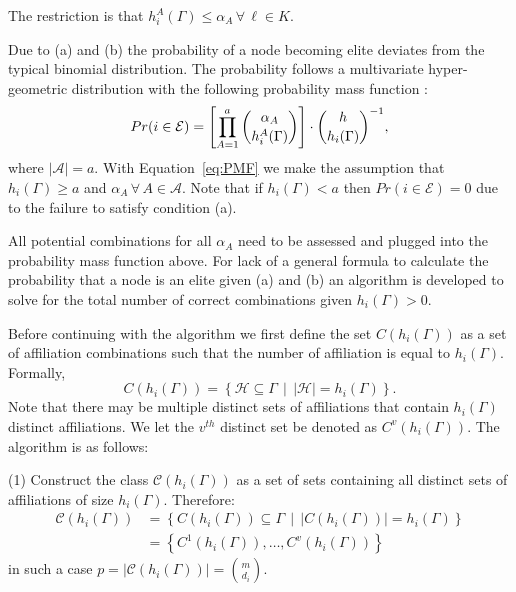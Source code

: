 \begin{subappendices}
\begin{abet}
\item The restriction is that $h^{A}_{i}(\Gamma) \leqslant \alpha_{A} \, \forall \, \ell \in K$.
\end{abet}
Due to (a) and (b) the probability of a node becoming elite deviates from the typical binomial distribution. The probability follows a multivariate hyper-geometric distribution with the following probability mass function :
\begin{equation} \label{eq:PMF}
Pr(i \in \mathcal{E}) =  \left[ \prod_{A = 1}^{a} \dbinom{\alpha_{A}}{h^{A}_{i}(\Gamma)} \right] \cdot \dbinom{h}{h_{i}(\Gamma)}^{-1},
\end{equation}
where $| \mathcal{A} | = a$. With Equation~\ref{eq:PMF} we make the assumption that $h_{i}(\Gamma) \geqslant a$ and $\alpha_{A} \, \forall \, A \in \mathcal{A}$. Note that if $h_{i}(\Gamma) < a$ then $Pr(i \in \mathcal{E}) = 0$ due to the failure to satisfy condition (a).

All potential combinations for all $\alpha_{A}$ need to be assessed and plugged into the probability mass function above. For lack of a general formula to calculate the probability that a node is an elite given (a) and (b) an algorithm is developed to solve for the total number of correct combinations given $h_{i}(\Gamma) > 0$.

Before continuing with the algorithm we first define the set $C(h_{i}(\Gamma))$ as a set of affiliation combinations such that the number of affiliation is equal to $h_{i}(\Gamma)$. Formally,
\[
C(h_{i}(\Gamma)) = \left\{ \mathcal{H} \subseteq \Gamma \, \mid \, | \mathcal{H} | = h_{i}(\Gamma) \right\} .
\]
Note that there may be multiple distinct sets of affiliations that contain $h_{i}(\Gamma)$ distinct affiliations. We let the $v^{th}$ distinct set be denoted as $C^{v}(h_{i}(\Gamma))$. The algorithm is as follows:

\begin{abet}
\item[(1)] Construct the class $\mathcal{C}(h_{i}(\Gamma))$ as a set of sets containing all distinct sets of affiliations of size $h_{i}(\Gamma)$. Therefore:
\begin{align*}
\mathcal{C}(h_{i}(\Gamma)) & = \left\{ C(h_{i}(\Gamma)) \subseteq \Gamma \, \mid \, | C(h_{i}(\Gamma)) | = h_{i}(\Gamma) \right\}\\
                   & = \left\{C^{1}(h_{i}(\Gamma)), \ldots, C^{v}(h_{i}(\Gamma))\right\}
\end{align*}
in such a case $p = | \mathcal{C}(h_{i}(\Gamma)) | = \binom{m}{d_{i}}$.


\end{abet}
\end{subappendices}
